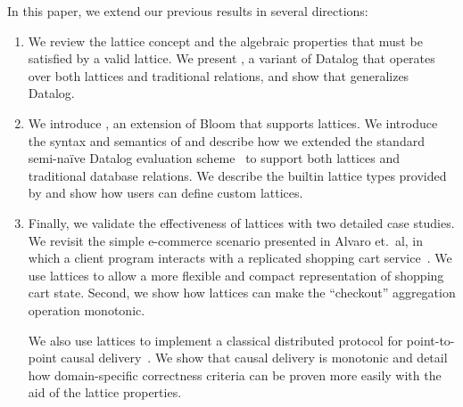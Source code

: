 In this paper, we extend our previous results in several directions:
\begin{enumerate}
\item
  We review the lattice concept and the algebraic properties that must be
  satisfied by a valid lattice. We present \baselang, a variant of Datalog that
  operates over both lattices and traditional relations, and show that \baselang
  generalizes Datalog.

\item
  We introduce \lang, an extension of Bloom that supports lattices. We introduce
  the syntax and semantics of \lang and describe how we extended the standard
  semi-na\"{i}ve Datalog evaluation scheme~\cite{Balbin1987} to support both
  lattices and traditional database relations. We describe the builtin lattice
  types provided by \lang and show how users can define custom lattices.

\item
  Finally, we validate the effectiveness of lattices with two detailed case
  studies. We revisit the simple e-commerce scenario presented in Alvaro et.\
  al, in which a client program interacts with a replicated shopping cart
  service~\cite{Alvaro2011}. We use lattices to allow a more flexible and
  compact representation of shopping cart state. Second, we show how lattices
  can make the ``checkout'' aggregation operation monotonic.

  We also use lattices to implement a classical distributed protocol for
  point-to-point causal delivery~\cite{Schiper1989}. We show that causal
  delivery is monotonic and detail how domain-specific correctness criteria can
  be proven more easily with the aid of the lattice properties.
\end{enumerate}
